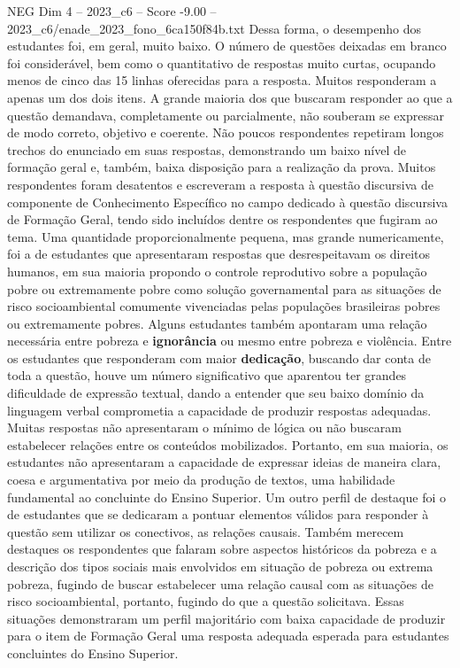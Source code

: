\begin{textsample}{NEG Dim 4 – 2023\_c6 – Score -9.00 – 2023\_c6/enade\_2023\_fono\_6ca150f84b.txt}
Dessa forma, o desempenho dos estudantes foi, em geral, muito baixo.
O número de questões deixadas em branco foi considerável, bem como o quantitativo de respostas muito curtas, ocupando menos de cinco das 15 linhas oferecidas para a resposta.
Muitos responderam a apenas um dos dois itens.
A grande maioria dos que buscaram responder ao que a questão demandava, completamente ou parcialmente, não souberam se expressar de modo correto, objetivo e coerente.
Não poucos respondentes repetiram longos trechos do enunciado em suas respostas, demonstrando um baixo nível de formação geral e, também, baixa disposição para a realização da prova.
Muitos respondentes foram desatentos e escreveram a resposta à questão discursiva de componente de Conhecimento Específico no campo dedicado à questão discursiva de Formação Geral, tendo sido incluídos dentre os respondentes que fugiram ao tema.
Uma quantidade proporcionalmente pequena, mas grande numericamente, foi a de estudantes que apresentaram respostas que desrespeitavam os direitos humanos, em sua maioria propondo o controle reprodutivo sobre a população pobre ou extremamente pobre como solução governamental para as situações de risco socioambiental comumente vivenciadas pelas populações brasileiras pobres ou extremamente pobres.
Alguns estudantes também apontaram uma relação necessária entre pobreza e \textbf{ignorância} ou mesmo entre pobreza e violência.
Entre os estudantes que responderam com maior \textbf{dedicação}, buscando dar conta de toda a questão, houve um número significativo que aparentou ter grandes dificuldade de expressão textual, dando a entender que seu baixo domínio da linguagem verbal comprometia a capacidade de produzir respostas adequadas.
Muitas respostas não apresentaram o mínimo de lógica ou não buscaram estabelecer relações entre os conteúdos mobilizados.
Portanto, em sua maioria, os estudantes não apresentaram a capacidade de expressar ideias de maneira clara, coesa e argumentativa por meio da produção de textos, uma habilidade fundamental ao concluinte do Ensino Superior.
Um outro perfil de destaque foi o de estudantes que se dedicaram a pontuar elementos válidos para responder à questão sem utilizar os conectivos, as relações causais.
Também merecem destaques os respondentes que falaram sobre aspectos históricos da pobreza e a descrição dos tipos sociais mais envolvidos em situação de pobreza ou extrema pobreza, fugindo de buscar estabelecer uma relação causal com as situações de risco socioambiental, portanto, fugindo do que a questão solicitava.
Essas situações demonstraram um perfil majoritário com baixa capacidade de produzir para o item de Formação Geral uma resposta adequada esperada para estudantes concluintes do Ensino Superior.

\end{textsample}
